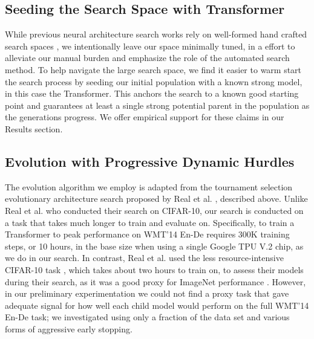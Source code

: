 \documentclass{article}
\begin{document}
\subsection{Seeding the Search Space with Transformer}

 While previous neural architecture search works rely on well-formed hand crafted search spaces \cite{zoph18}, we intentionally leave our space minimally tuned, in a effort to alleviate our manual burden and emphasize the role of the automated search method. To help navigate the large search space, we find it easier to warm start the search process by seeding our initial population with a known strong model, in this case the Transformer. This anchors the search to a known good starting point and guarantees at least a single strong potential parent in the population as the generations progress. We offer empirical support for these claims in our Results section. 

\subsection{Evolution with Progressive Dynamic Hurdles}

The evolution algorithm we employ is adapted from the tournament selection evolutionary architecture search proposed by Real et al. , described above. Unlike Real et al.  who conducted their search on CIFAR-10, our search is conducted on a task that takes much longer to train and evaluate on. 
Specifically, to train a Transformer to peak performance on WMT'14 En-De requires 300K training steps, or 10 hours, in the base size when using a single Google TPU V.2 chip, as we do in our search. In contrast, Real et al.  used the less resource-intensive CIFAR-10 task \cite{krizhevsky09}, which takes about two hours to train on, to assess their models during their search, as it was a good proxy for ImageNet \cite{deng2009} performance \cite{zoph18}. However, in our preliminary experimentation we could not find a proxy task that gave adequate signal for how well each child model would perform on the full WMT'14 En-De task; we investigated using only a fraction of the data set and various forms of aggressive early stopping.
\end{document}
